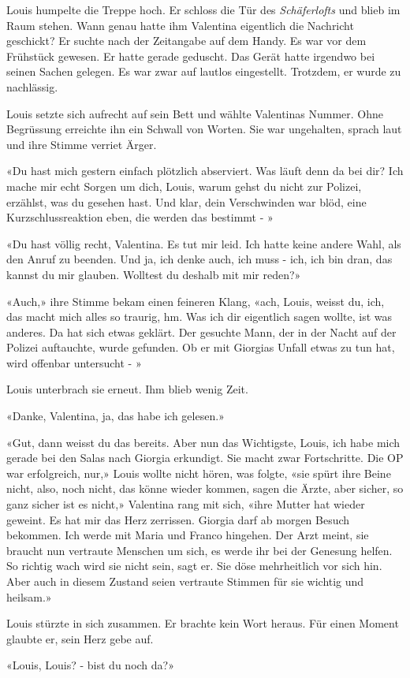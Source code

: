 Louis humpelte die Treppe hoch. Er schloss die Tür des
\emph{Schäferlofts} und blieb im Raum stehen. Wann genau
hatte ihm Valentina eigentlich die Nachricht geschickt? Er suchte nach
der Zeitangabe auf dem Handy. Es war vor dem Frühstück gewesen. Er hatte
gerade geduscht. Das Gerät hatte irgendwo bei seinen Sachen gelegen. Es
war zwar auf lautlos eingestellt. Trotzdem, er wurde zu nachlässig.

Louis setzte sich aufrecht auf sein Bett und wählte Valentinas Nummer.
Ohne Begrüssung erreichte ihn ein Schwall von Worten. Sie war
ungehalten, sprach laut und ihre Stimme verriet Ärger.

«Du hast mich gestern einfach plötzlich abserviert. Was läuft denn da
bei dir? Ich mache mir echt Sorgen um dich, Louis, warum gehst du nicht
zur Polizei, erzählst, was du gesehen hast. Und klar, dein Verschwinden
war blöd, eine Kurzschlussreaktion eben, die werden das bestimmt - »

«Du hast völlig recht, Valentina. Es tut mir leid. Ich hatte keine
andere Wahl, als den Anruf zu beenden. Und ja, ich denke auch, ich muss - ich, ich bin dran, das kannst du mir glauben. Wolltest du deshalb
mit mir reden?»

«Auch,» ihre Stimme bekam einen feineren Klang, «ach,
Louis, weisst du, ich, das macht mich alles so traurig, hm. Was ich dir
eigentlich sagen wollte, ist was anderes. Da hat sich etwas geklärt. Der gesuchte
Mann, der in der Nacht auf der Polizei auftauchte, wurde gefunden. Ob er
mit Giorgias Unfall etwas zu tun hat, wird offenbar untersucht - »

Louis unterbrach sie erneut. Ihm blieb wenig Zeit.

«Danke, Valentina, ja, das habe ich gelesen.»

«Gut, dann weisst du das bereits. Aber nun das Wichtigste, Louis, ich
habe mich gerade bei den Salas nach Giorgia erkundigt. Sie macht zwar
Fortschritte. Die OP war erfolgreich, nur,» Louis wollte nicht hören,
was folgte, «sie spürt ihre Beine nicht, also, noch nicht, das könne
wieder kommen, sagen die Ärzte, aber sicher, so ganz sicher ist es
nicht,» Valentina rang mit sich, «ihre Mutter hat wieder geweint. Es hat
mir das Herz zerrissen. Giorgia darf ab morgen Besuch bekommen. Ich
werde mit Maria und Franco hingehen. Der Arzt meint, sie braucht nun
vertraute Menschen um sich, es werde ihr bei der Genesung helfen. So
richtig wach wird sie nicht sein, sagt er. Sie döse mehrheitlich vor
sich hin. Aber auch in diesem Zustand seien vertraute Stimmen für sie
wichtig und heilsam.»

Louis stürzte in sich zusammen. Er brachte kein Wort heraus. Für einen
Moment glaubte er, sein Herz gebe auf.

«Louis, Louis? - bist du noch da?»


